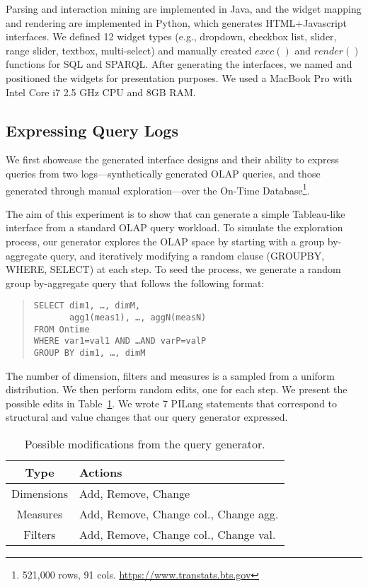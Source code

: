 Parsing and interaction mining are implemented in Java, and the widget mapping and rendering are implemented in Python, which generates HTML+Javascript interfaces.  We defined 12 widget types (e.g., dropdown, checkbox list, slider, range slider, textbox, multi-select) and manually created $exec()$ and $render()$ functions for SQL and SPARQL.   After generating the interfaces, we named and positioned the widgets for presentation purposes. We used a MacBook Pro with Intel Core i7 2.5 GHz CPU and 8GB RAM.

\subsection{Expressing Query Logs}
\label{sec:case_stud}

We first showcase the generated interface designs and their ability to express queries from two logs---synthetically generated OLAP queries, and those generated through manual exploration---over the On-Time Database\footnote{\small 521,000 rows, 91 cols. \url{https://www.transtats.bts.gov}}.


 The aim of this experiment is to show that \sys{} can generate a simple Tableau-like interface from a standard OLAP query workload.
To simulate the exploration process, our generator explores the OLAP space by starting with a group by-aggregate query, and iteratively modifying a random clause (GROUPBY, WHERE, SELECT) at each step. To seed the process, we generate a random group by-aggregate query that follows the following format:
\begin{verse}
\texttt{SELECT dim1, \ldots, dimM,}\\
        \texttt{~~~~~~~agg1(meas1), \ldots, aggN(measN)}\\
\texttt{FROM Ontime}\\
\texttt{WHERE var1=val1 AND \ldots AND varP=valP}\\
\texttt{GROUP BY dim1, \ldots, dimM}\\
\end{verse}
The number of dimension, filters and measures is a sampled from a uniform distribution. We then perform random edits, one for each step. We present the possible edits in Table~\ref{tab:changes}. We wrote 7 PILang statements that correspond to structural and value changes that our query generator expressed.

\begin{table}
\caption{Possible modifications from the query generator.}
\begin{tabular}{ c l }
\hline
  Type &  Actions\\
  \hline
  Dimensions &  Add, Remove, Change\\
  Measures   & Add, Remove, Change col., Change agg.\\
  Filters    &  Add, Remove, Change col., Change val.\\
  \hline
\end{tabular}
\label{tab:changes}
\end{table}


